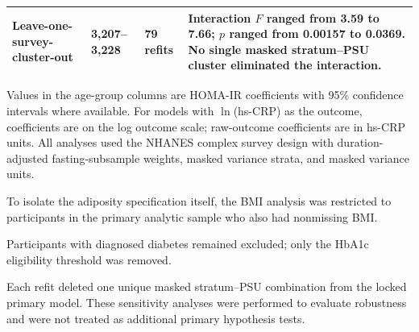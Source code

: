 \begin{landscape}
\begin{table}[p]
\begin{threeparttable}
\begin{tabular}{p{3.1cm} p{2.0cm} p{2.8cm} p{2.8cm} p{2.8cm} p{3.4cm}}
\addlinespace

Leave-one-survey-cluster-out\tnote{c} &
3,207--3,228 &
79 refits &
\multicolumn{3}{l}{Interaction $F$ ranged from 3.59 to 7.66; $p$ ranged from 0.00157 to 0.0369. No single masked stratum--PSU cluster eliminated the interaction.} \\

\bottomrule
\end{tabular}

\begin{tablenotes}[flushleft]
\footnotesize
\item Values in the age-group columns are HOMA-IR coefficients with 95\% confidence intervals where available.
For models with $\ln$(hs-CRP) as the outcome, coefficients are on the log outcome scale; raw-outcome coefficients are in hs-CRP units.
All analyses used the NHANES complex survey design with duration-adjusted fasting-subsample weights,
masked variance strata, and masked variance units.
\item[a] To isolate the adiposity specification itself, the BMI analysis was restricted to participants in the primary analytic sample who also had nonmissing BMI.
\item[b] Participants with diagnosed diabetes remained excluded; only the HbA1c eligibility threshold was removed.
\item[c] Each refit deleted one unique masked stratum--PSU combination from the locked primary model.
These sensitivity analyses were performed to evaluate robustness and were not treated as additional primary hypothesis tests.
\end{tablenotes}
\end{threeparttable}
\end{table}
\end{landscape}
